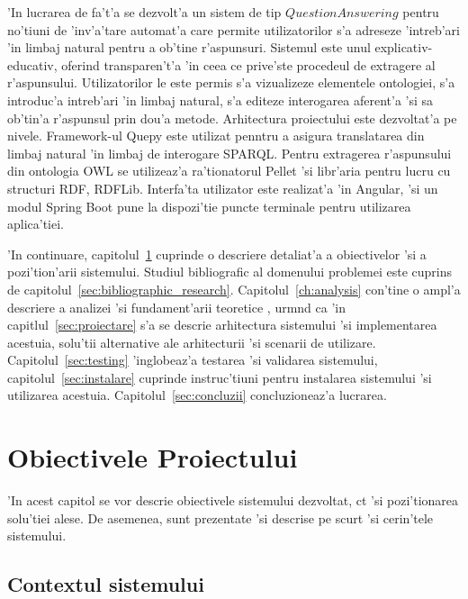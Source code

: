 \documentclass[12pt,a4paper,twoside]{report}
\begin{document}
'In lucrarea de fa't'a se dezvolt'a un sistem de tip $Question Answering$ pentru no'tiuni de 'inv'a'tare automat'a care permite utilizatorilor s'a adreseze 'intreb'ari 'in limbaj natural pentru a ob'tine r'aspunsuri. Sistemul este unul explicativ-educativ, oferind transparen't'a 'in ceea ce prive'ste procedeul de extragere al r'aspunsului. Utilizatorilor le este permis s'a vizualizeze elementele ontologiei, s'a introduc'a intreb'ari 'in limbaj natural, s'a editeze interogarea aferent'a 'si sa ob'tin'a r'aspunsul prin dou'a metode. Arhitectura proiectului este dezvoltat'a pe nivele. Framework-ul Quepy este utilizat penntru a asigura translatarea din limbaj natural 'in limbaj de interogare SPARQL. Pentru extragerea r'aspunsului din ontologia OWL se utilizeaz'a ra'tionatorul Pellet 'si libr'aria pentru lucru cu structuri RDF, RDFLib. Interfa'ta utilizator este realizat'a 'in Angular, 'si un modul Spring Boot pune la dispozi'tie puncte terminale pentru utilizarea aplica'tiei.

'In continuare, capitolul~\ref{sec:objectives} cuprinde o descriere detaliat'a a obiectivelor 'si a pozi'tion'arii  sistemului. Studiul bibliografic al domenului problemei este cuprins de capitolul~\ref{sec:bibliographic_research}. Capitolul~\ref{ch:analysis} con'tine o ampl'a descriere a analizei 'si fundament'arii teoretice , urm\ia nd ca 'in capitlul~\ref{sec:proiectare} s'a se descrie arhitectura sistemului 'si implementarea acestuia, solu'tii alternative ale arhitecturii 'si scenarii de utilizare. Capitolul~\ref{sec:testing} 'inglobeaz'a testarea 'si validarea sistemului, capitolul~\ref{sec:instalare} cuprinde instruc'tiuni pentru instalarea sistemului 'si utilizarea acestuia. Capitolul~\ref{sec:concluzii} concluzioneaz'a lucrarea.



\chapter{Obiectivele Proiectului}
\label{sec:objectives}

'In acest capitol se vor descrie obiectivele sistemului dezvoltat, c\ia t 'si pozi'tionarea solu'tiei alese. De asemenea, sunt prezentate 'si descrise pe scurt 'si cerin'tele sistemului.

\section{Contextul sistemului}
\end{document}
